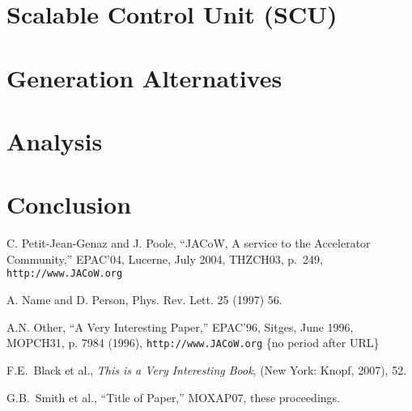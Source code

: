 \documentclass{JAC2003}
\begin{document}
\section{Scalable Control Unit (SCU)}


\section{Generation Alternatives}


\section{Analysis}


\section{Conclusion}




\begin{thebibliography}{9}   %

C. Petit-Jean-Genaz and J. Poole, ``JACoW, A service to the Accelerator Community,''
EPAC'04, Lucerne, July 2004, THZCH03,  p.~249, \texttt{http://www.JACoW.org}

 A. Name and D. Person, Phys. Rev. Lett. 25 (1997) 56.

A.N. Other, ``A Very Interesting Paper,'' EPAC'96, Sitges, June 1996, MOPCH31, p. 7984 (1996),
\texttt{http://www.JACoW.org}  \{no period after URL\}

F.E.~Black et al., {\it This is a Very Interesting Book}, (New York: Knopf, 2007), 52.

G.B.~Smith et al., ``Title of Paper,'' MOXAP07, these proceedings.
\end{thebibliography}
\end{document}
